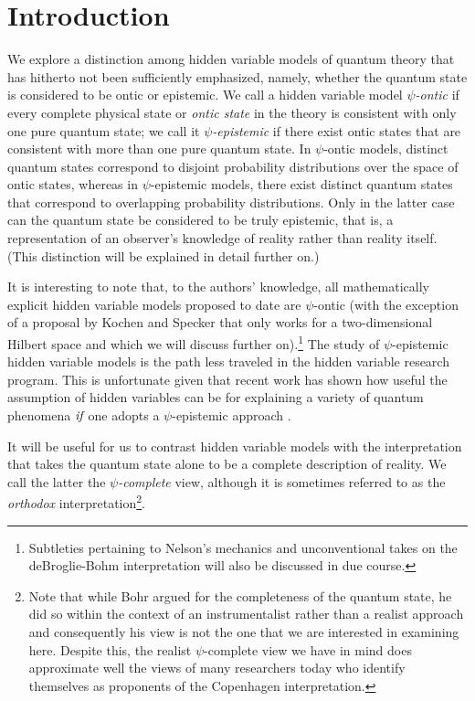 \documentclass[aps,nofootinbib,12pt]{revtex4}
\begin{document}
\maketitle


\section{Introduction \label{SEC:intro}}


We explore a distinction among hidden variable models of quantum
theory that has hitherto not been sufficiently emphasized, namely,
whether the quantum state is considered to be ontic or epistemic. We
call a hidden variable model \emph{$\psi$-ontic} if every complete
physical state or \emph{ontic state} \cite{Spekkens_con} in the
theory is consistent with only one pure quantum state; we call it
\emph{$\psi$-epistemic} if there exist ontic states that are
consistent with more than one pure quantum state. In $\psi$-ontic
models, distinct quantum states correspond to disjoint probability
distributions over the space of ontic states, whereas in
$\psi$-epistemic models, there exist distinct quantum states that
correspond to overlapping probability distributions. Only in the
latter case can the quantum state be considered to be truly
epistemic, that is, a representation of an observer's knowledge of
reality rather than reality itself. (This distinction will be
explained in detail further on.)

It is interesting to note that, to the authors' knowledge, all
mathematically explicit hidden variable models proposed to date are
$\psi$-ontic (with the exception of a proposal by Kochen and Specker
\cite{Ks} that only works for a two-dimensional Hilbert space and
which we will discuss further on).\footnote{Subtleties pertaining to
Nelson's mechanics and unconventional takes on the deBroglie-Bohm
interpretation will also be discussed in due course.} The study of
$\psi$-epistemic hidden variable models is the path less traveled in
the hidden variable research program. This is unfortunate given that
recent work has shown how useful the assumption of hidden variables
can be for explaining a variety of quantum phenomena $\emph{if}$ one
adopts a $\psi$-epistemic approach
\cite{Hardydisentangling,toy_theory,BRSLiouville,tr_model}.

It will be useful for us to contrast hidden variable models with the
interpretation that takes the quantum state alone to be a complete
description of reality. We call the latter the
\emph{$\psi$-complete} view, although it is sometimes referred to as
the \emph{orthodox} interpretation\footnote{Note that while Bohr
argued for the completeness of the quantum state, he did so within
the context of an instrumentalist rather than a realist approach and
consequently his view is not the one that we are interested in
examining here. Despite this, the realist $\psi$-complete view we
have in mind does approximate well the views of many researchers
today who identify themselves as proponents of the Copenhagen
interpretation.}.
\end{document}
